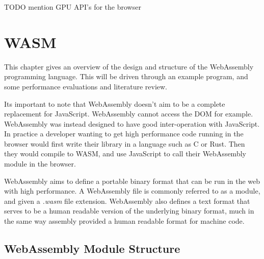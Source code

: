 \documentclass[11pt]{book}
\begin{document}
TODO mention GPU API's for the browser

\chapter{WASM}
This chapter gives an overview of the design and structure of the WebAssembly programming language. This will be driven through an example program, and some performance evaluations and literature review. 



Its important to note that WebAssembly doesn't aim to be a complete replacement for JavaScript. WebAssembly cannot access the DOM for example. WebAssembly was instead designed to have good inter-operation with JavaScript. In practice a developer wanting to get high performance code running in the browser would first write their library in a language such as C or Rust. Then they would compile to WASM, and use JavaScript to call their WebAssembly module in the browser. 




WebAssembly aims to define a portable binary format that can be run in the web with high performance. A WebAssembly file is commonly referred to as a module, and given a \textit{.wasm} file extension. WebAssembly also defines a text format that serves to be a human readable version of the underlying binary format, much in the same way assembly provided a human readable format for machine code. 



\section{WebAssembly Module Structure}
\end{document}
